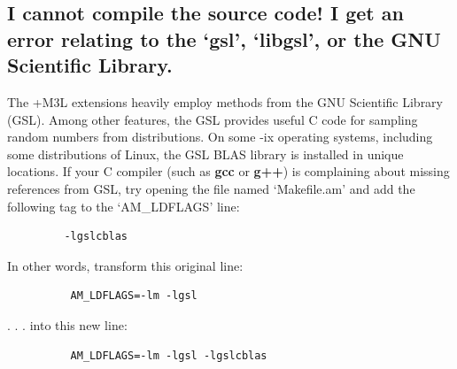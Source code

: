 \documentclass[11pt]{article}
\begin{document}
\subsection{I cannot compile the source code! I get an error relating to the `gsl', `libgsl', or the GNU Scientific Library.}

The +M3L extensions heavily employ methods from the GNU Scientific Library (GSL).  Among other features, the GSL provides useful C code for sampling random numbers from distributions.  On some -ix operating systems, including some distributions of Linux, the GSL BLAS library is installed in unique locations.  If your C compiler (such as \textbf{gcc} or \textbf{g++}) is complaining about missing references from GSL, try opening the file named `Makefile.am' and add the following tag to the `AM\_LDFLAGS' line:

\begin{verbatim}
         -lgslcblas
\end{verbatim}

\noindent In other words, transform this original line:

\begin{verbatim}
          AM_LDFLAGS=-lm -lgsl
\end{verbatim}

\noindent . . . into this new line:

\begin{verbatim}
          AM_LDFLAGS=-lm -lgsl -lgslcblas
\end{verbatim}

\pagebreak


\end{document}
